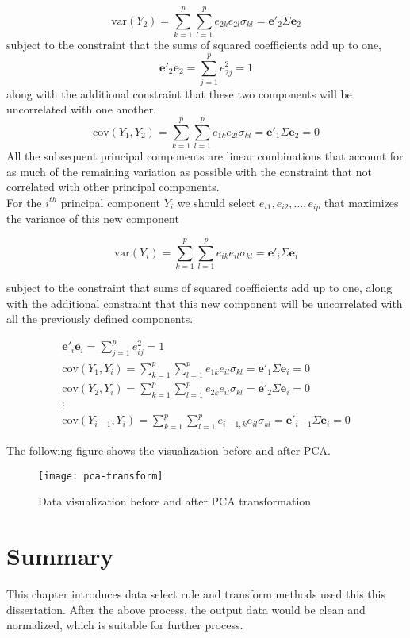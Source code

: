 \begin{equation}
\text{var}(Y_2) = \sum_{k=1}^{p}\sum_{l=1}^{p}e_{2k}e_{2l}\sigma_{kl} = \mathbf{e}'_2\Sigma\mathbf{e}_2
\end{equation}
subject to the constraint that the sums of squared coefficients add up to one,
\begin{equation}
\mathbf{e}'_2\mathbf{e}_2 = \sum_{j=1}^{p}e^2_{2j} = 1
\end{equation}
along with the additional constraint that these two components will be uncorrelated with one another.
\begin{equation}
\text{cov}(Y_1, Y_2) = \sum_{k=1}^{p}\sum_{l=1}^{p}e_{1k}e_{2l}\sigma_{kl} = \mathbf{e}'_1\Sigma\mathbf{e}_2 = 0
\end{equation}
All the subsequent principal components are linear combinations that account for as much of the remaining variation as possible with the constraint that not correlated with other principal components.\\
For the $ i^{th} $ principal component $ Y_i $ we should select $ e_{i1}, e_{i2}, \dots, e_{ip} $ that maximizes the variance of this new component

\begin{equation}
\text{var}(Y_i) = \sum_{k=1}^{p}\sum_{l=1}^{p}e_{ik}e_{il}\sigma_{kl} = \mathbf{e}'_i\Sigma\mathbf{e}_i
\end{equation}

subject to the constraint that sums of squared coefficients add up to one, along with the additional constraint that this new component will be uncorrelated with all the previously defined components.

\begin{gather*}
\mathbf{e}'_i\mathbf{e}_i = \sum_{j=1}^{p}e^2_{ij} = 1\\
\text{cov}(Y_1, Y_i) = \sum_{k=1}^{p}\sum_{l=1}^{p}e_{1k}e_{il}\sigma_{kl} = \mathbf{e}'_1\Sigma\mathbf{e}_i = 0\\
\text{cov}(Y_2, Y_i) = \sum_{k=1}^{p}\sum_{l=1}^{p}e_{2k}e_{il}\sigma_{kl} = \mathbf{e}'_2\Sigma\mathbf{e}_i = 0\\
\vdots\\
\text{cov}(Y_{i-1}, Y_i) = \sum_{k=1}^{p}\sum_{l=1}^{p}e_{i-1,k}e_{il}\sigma_{kl} = \mathbf{e}'_{i-1}\Sigma\mathbf{e}_i = 0
\end{gather*}

The following figure shows the visualization before and after PCA.
\begin{figure}[h]
	\centering
	\texttt{[image: pca-transform]}
	\caption{Data visualization before and after PCA transformation\cite{6_tan_steinbach_kumar_2005}}
\end{figure}

\clearpage
\section{Summary}
This chapter introduces data select rule and transform methods used this this dissertation. After the above process, the output data would be clean and normalized, which is suitable for further process.
